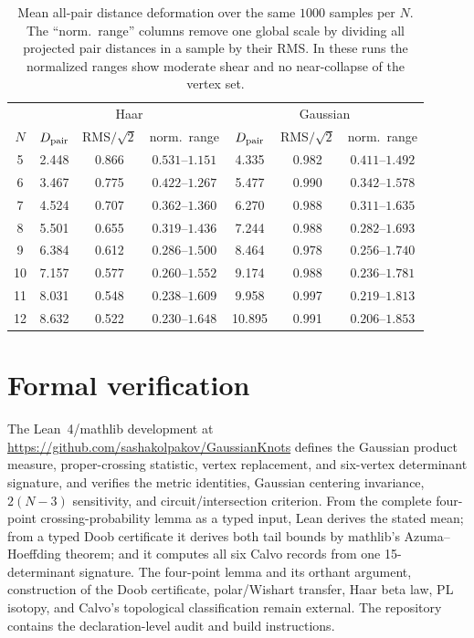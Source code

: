 \documentclass[11pt]{amsart}
\theoremstyle{remark}
\newcommand{\1}{\mathbf{1}}
\begin{document}
\begin{table}[ht]
\centering
\scriptsize
\begin{tabular}{c|ccc|ccc}
& \multicolumn{3}{c|}{Haar} & \multicolumn{3}{c}{Gaussian}\\
\(N\) & \(D_{\rm pair}\) & RMS\(/\sqrt2\) & norm.\ range
& \(D_{\rm pair}\) & RMS\(/\sqrt2\) & norm.\ range\\
\hline
5  & 2.448 & 0.866 & \(0.531\)--\(1.151\) & 4.335  & 0.982 & \(0.411\)--\(1.492\)\\
6  & 3.467 & 0.775 & \(0.422\)--\(1.267\) & 5.477  & 0.990 & \(0.342\)--\(1.578\)\\
7  & 4.524 & 0.707 & \(0.362\)--\(1.360\) & 6.270  & 0.988 & \(0.311\)--\(1.635\)\\
8  & 5.501 & 0.655 & \(0.319\)--\(1.436\) & 7.244  & 0.988 & \(0.282\)--\(1.693\)\\
9  & 6.384 & 0.612 & \(0.286\)--\(1.500\) & 8.464  & 0.978 & \(0.256\)--\(1.740\)\\
10 & 7.157 & 0.577 & \(0.260\)--\(1.552\) & 9.174  & 0.988 & \(0.236\)--\(1.781\)\\
11 & 8.031 & 0.548 & \(0.238\)--\(1.609\) & 9.958  & 0.997 & \(0.219\)--\(1.813\)\\
12 & 8.632 & 0.522 & \(0.230\)--\(1.648\) & 10.895 & 0.991 & \(0.206\)--\(1.853\)
\end{tabular}
\caption{Mean all-pair distance deformation over the same \(1000\) samples per \(N\).  The
``norm.\ range'' columns remove one global scale by dividing all projected pair distances in
a sample by their RMS.  In these runs the normalized ranges show moderate shear and no
near-collapse of the vertex set.}
\label{tab:metric-deformation}
\end{table}

\section{Formal verification}

The Lean~4/mathlib development at
\url{https://github.com/sashakolpakov/GaussianKnots} defines the Gaussian
product measure, proper-crossing statistic, vertex replacement, and
six-vertex determinant signature, and verifies the metric identities,
Gaussian centering invariance, \(2(N-3)\) sensitivity, and circuit/intersection
criterion.  From the complete four-point crossing-probability lemma as a typed
input, Lean derives the stated mean; from a typed Doob certificate it derives
both tail bounds by mathlib's Azuma--Hoeffding theorem; and it computes all six
Calvo records from one 15-determinant signature.  The four-point lemma and its
orthant argument, construction of the Doob certificate, polar/Wishart transfer,
Haar beta law, PL isotopy, and Calvo's topological classification remain
external.  The repository contains the declaration-level audit and build
instructions.
\end{document}
